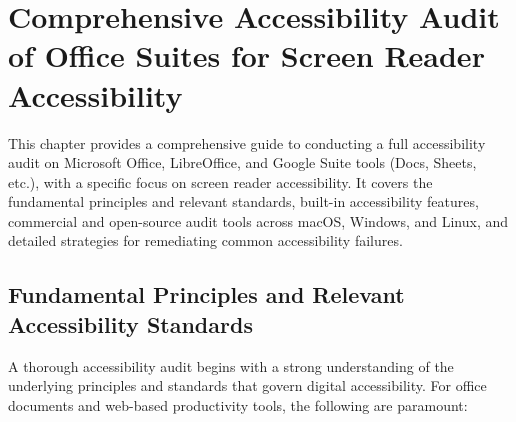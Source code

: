 \chapter{Comprehensive Accessibility Audit of Office Suites for Screen Reader Accessibility}
\label{chap:office-suite-audit}

This chapter provides a comprehensive guide to conducting a full accessibility audit on Microsoft Office, LibreOffice, and Google Suite tools (Docs, Sheets, etc.), with a specific focus on screen reader accessibility. It covers the fundamental principles and relevant standards, built-in accessibility features, commercial and open-source audit tools across macOS, Windows, and Linux, and detailed strategies for remediating common accessibility failures.

\section{Fundamental Principles and Relevant Accessibility Standards}
\label{sec:office-principles-standards}

A thorough accessibility audit begins with a strong understanding of the underlying principles and standards that govern digital accessibility. For office documents and web-based productivity tools, the following are paramount:

